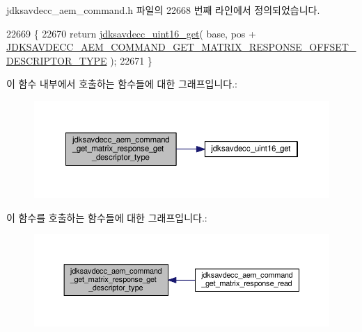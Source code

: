 jdksavdecc\+\_\+aem\+\_\+command.\+h 파일의 22668 번째 라인에서 정의되었습니다.


\begin{DoxyCode}
22669 \{
22670     \textcolor{keywordflow}{return} \hyperlink{group__endian_ga3fbbbc20be954aa61e039872965b0dc9}{jdksavdecc\_uint16\_get}( base, pos + 
      \hyperlink{group__command__get__matrix__response_ga18b5d3b3fb2fb1bd896754f1f844db51}{JDKSAVDECC\_AEM\_COMMAND\_GET\_MATRIX\_RESPONSE\_OFFSET\_DESCRIPTOR\_TYPE}
       );
22671 \}
\end{DoxyCode}


이 함수 내부에서 호출하는 함수들에 대한 그래프입니다.\+:
\nopagebreak
\begin{figure}[H]
\begin{center}
\leavevmode
\includegraphics[width=350pt]{group__command__get__matrix__response_ga69958e72b1d4189f9c21965b6f40d17a_cgraph}
\end{center}
\end{figure}




이 함수를 호출하는 함수들에 대한 그래프입니다.\+:
\nopagebreak
\begin{figure}[H]
\begin{center}
\leavevmode
\includegraphics[width=350pt]{group__command__get__matrix__response_ga69958e72b1d4189f9c21965b6f40d17a_icgraph}
\end{center}
\end{figure}


